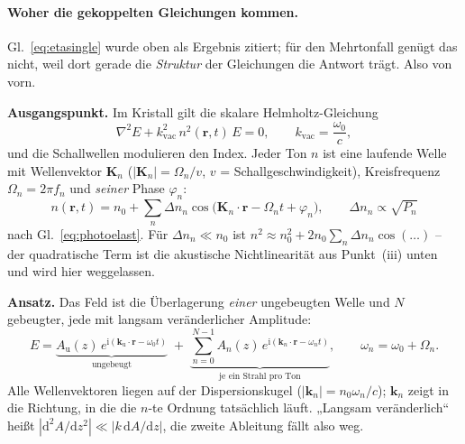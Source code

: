 \documentclass[11pt,a4paper]{article}
\begin{document}
\paragraph{Woher die gekoppelten Gleichungen kommen.}
Gl.~\eqref{eq:etasingle} wurde oben als Ergebnis zitiert; für den
Mehrtonfall genügt das nicht, weil dort gerade die \emph{Struktur} der
Gleichungen die Antwort trägt. Also von vorn.

\medskip
\noindent\textbf{Ausgangspunkt.} Im Kristall gilt die skalare
Helmholtz-Gleichung
\begin{equation}
  \nabla^2 E + k_\mathrm{vac}^2\,n^2(\mathbf{r},t)\,E = 0 ,
  \qquad k_\mathrm{vac} = \frac{\omega_0}{c} ,
\end{equation}
und die Schallwellen modulieren den Index. Jeder Ton $n$ ist eine laufende
Welle mit Wellenvektor $\mathbf{K}_n$ ($|\mathbf{K}_n| = \Omega_n/v$,
$v$ = Schallgeschwindigkeit), Kreisfrequenz $\Omega_n = 2\pi f_n$ und
\emph{seiner} Phase $\varphi_n$:
\begin{equation}
  n(\mathbf{r},t) = n_0 + \sum_n \Delta n_n
    \cos\!\bigl(\mathbf{K}_n\!\cdot\!\mathbf{r} - \Omega_n t + \varphi_n\bigr),
  \qquad \Delta n_n \propto \sqrt{P_n}
\end{equation}
nach Gl.~\eqref{eq:photoelast}. Für $\Delta n_n\ll n_0$ ist
$n^2 \approx n_0^2 + 2n_0\sum_n\Delta n_n\cos(\dots)$ -- der quadratische
Term ist die akustische Nichtlinearität aus Punkt~(iii) unten und wird hier
weggelassen.

\medskip
\noindent\textbf{Ansatz.} Das Feld ist die Überlagerung \emph{einer}
ungebeugten Welle und $N$ gebeugter, jede mit langsam veränderlicher
Amplitude:
\begin{equation}
  E = \underbrace{A_\mathrm{u}(z)\,
        e^{\mathrm{i}(\mathbf{k}_\mathrm{u}\cdot\mathbf{r}-\omega_0 t)}}_{
        \text{ungebeugt}}
    \;+\; \underbrace{\sum_{n=0}^{N-1} A_n(z)\,
        e^{\mathrm{i}(\mathbf{k}_n\cdot\mathbf{r}-\omega_n t)}}_{
        \text{je ein Strahl pro Ton}} ,
  \qquad
  \omega_n = \omega_0 + \Omega_n .
  \label{eq:ansatz}
\end{equation}
Alle Wellenvektoren liegen auf der Dispersionskugel
($|\mathbf{k}_n| = n_0\omega_n/c$); $\mathbf{k}_n$ zeigt in die Richtung, in
die die $n$-te Ordnung tatsächlich läuft. „Langsam veränderlich`` heißt
$|\mathrm{d}^2A/\mathrm{d}z^2| \ll |k\,\mathrm{d}A/\mathrm{d}z|$, die
zweite Ableitung fällt also weg.

\medskip
\noindent{}
\end{document}
